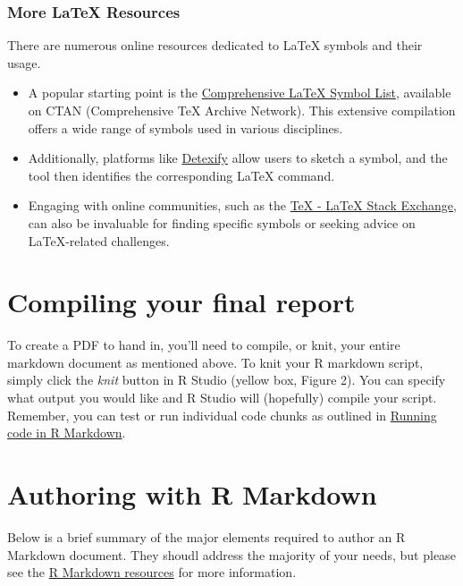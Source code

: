 \documentclass[
]{book}
\providecommand{\tightlist}{%
  \setlength{\itemsep}{0pt}\setlength{\parskip}{0pt}}
\begin{document}
\hypertarget{more-latex-resources}{%
\subsubsection{More LaTeX Resources}\label{more-latex-resources}}

There are numerous online resources dedicated to LaTeX symbols and their usage.

\begin{itemize}
\tightlist
\item
  A popular starting point is the \href{https://ctan.org/pkg/comprehensive}{Comprehensive LaTeX Symbol List}, available on CTAN (Comprehensive TeX Archive Network). This extensive compilation offers a wide range of symbols used in various disciplines.
\item
  Additionally, platforms like \href{http://detexify.kirelabs.org/classify.html}{Detexify} allow users to sketch a symbol, and the tool then identifies the corresponding LaTeX command.
\item
  Engaging with online communities, such as the \href{https://tex.stackexchange.com/}{TeX - LaTeX Stack Exchange}, can also be invaluable for finding specific symbols or seeking advice on LaTeX-related challenges.
\end{itemize}

\hypertarget{compiling-your-final-report}{%
\section{Compiling your final report}\label{compiling-your-final-report}}

To create a PDF to hand in, you'll need to compile, or knit, your entire markdown document as mentioned above. To knit your R markdown script, simply click the \emph{knit} button in R Studio (yellow box, Figure 2). You can specify what output you would like and R Studio will (hopefully) compile your script. Remember, you can test or run individual code chunks as outlined in \protect\hyperlink{running-code-in-r-markdown}{Running code in R Markdown}.

\hypertarget{authoring-with-r-markdown}{%
\section{Authoring with R Markdown}\label{authoring-with-r-markdown}}

Below is a brief summary of the major elements required to author an R Markdown document. They shoudl address the majority of your needs, but please see the \protect\hyperlink{r-markdown-resources}{R Markdown resources} for more information.
\end{document}
